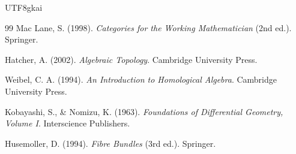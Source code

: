 \documentclass[12pt]{article}
\begin{document}
\begin{CJK*}{UTF8}{gkai}
\begin{thebibliography}{99}
Mac Lane, S. (1998).
\newblock \emph{Categories for the Working Mathematician} (2nd ed.).
\newblock Springer.

Hatcher, A. (2002).
\newblock \emph{Algebraic Topology}.
\newblock Cambridge University Press.

Weibel, C. A. (1994).
\newblock \emph{An Introduction to Homological Algebra}.
\newblock Cambridge University Press.

Kobayashi, S., \& Nomizu, K. (1963).
\newblock \emph{Foundations of Differential Geometry, Volume I}.
\newblock Interscience Publishers.

Husemoller, D. (1994).
\newblock \emph{Fibre Bundles} (3rd ed.).
\newblock Springer.

\end{thebibliography}

\end{CJK*}
\end{document}
